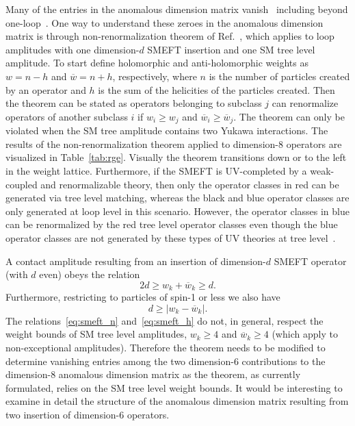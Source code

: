 Many of the entries in the anomalous dimension matrix vanish~\cite{Cheung:2015aba} including beyond one-loop~\cite{Bern:2020ikv}.
One way to understand these zeroes in the anomalous dimension matrix is through non-renormalization theorem of Ref.~\cite{Cheung:2015aba}, which applies to loop amplitudes with one dimension-$d$ SMEFT insertion and one SM tree level amplitude.
To start define holomorphic and anti-holomorphic weights as $w = n - h$ and $\overline w = n + h$, respectively, where $n$ is the number of particles created by an operator and $h$ is the sum of the helicities of the particles created.
Then the theorem can be stated as operators belonging to subclass $j$ can renormalize operators of another subclass $i$ if $w_i \geq w_j$ and $\overline w_i \geq \overline w_j$.
The theorem can only be violated when the SM tree amplitude contains two Yukawa interactions.
The results of the non-renormalization theorem applied to dimension-8 operators are visualized in Table~\ref{tab:rge}.
Visually the theorem transitions down or to the left in the weight lattice.
Furthermore, if the SMEFT is UV-completed by a weak-coupled and renormalizable theory, then only the operator classes in red can be generated via tree level matching, whereas the black and blue operator classes are only generated at loop level in this scenario.
However, the operator classes in blue can be renormalized by the red tree level operator classes even though the blue operator classes are not generated by these types of UV theories at tree level~\cite{Craig:2019wmo}.

A contact amplitude resulting from an insertion of dimension-$d$ SMEFT operator (with $d$ even) obeys the relation
\begin{equation}
\label{eq:smeft_n}
2 d \geq w_k + \overline w_k \geq d .
\end{equation}
Furthermore, restricting to particles of spin-1 or less we also have
\begin{equation}
\label{eq:smeft_h}
d \geq |w_k - \overline w_k| .
\end{equation}
The relations~\eqref{eq:smeft_n} and~\eqref{eq:smeft_h} do not, in general, respect the weight bounds of SM tree level amplitudes, $w_k \geq 4$ and $\overline w_k \geq 4$ (which apply to non-exceptional amplitudes).
Therefore the theorem needs to be modified to determine vanishing entries among the two dimension-6 contributions to the dimension-8 anomalous dimension matrix as the theorem, as currently formulated, relies on the SM tree level weight bounds.
It would be interesting to examine in detail the structure of the anomalous dimension matrix resulting from two insertion of dimension-6 operators.

